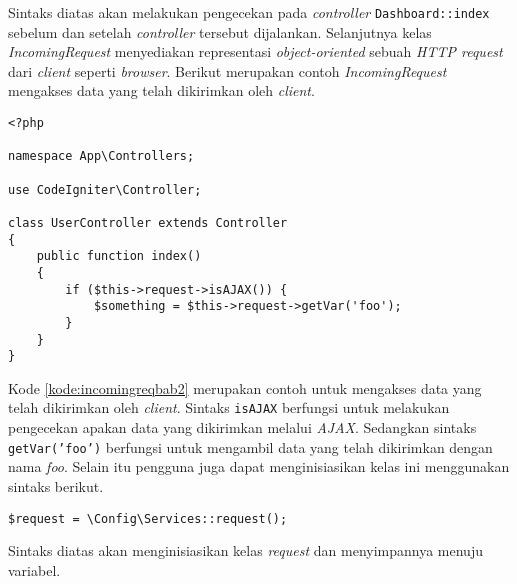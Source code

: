Sintaks diatas akan melakukan pengecekan pada \textit{controller} \texttt{Dashboard::index} sebelum dan setelah \textit{controller} tersebut dijalankan. Selanjutnya kelas \textit{IncomingRequest} menyediakan representasi \textit{object-oriented} sebuah \textit{HTTP request} dari \textit{client} seperti \textit{browser}. Berikut merupakan contoh \textit{IncomingRequest} mengakses data yang telah dikirimkan oleh \textit{client}.
\begin{lstlisting}[caption=Contoh mengakses data menggunakan \textit{IncomingRequest},label=kode:incomingreqbab2]
<?php

namespace App\Controllers;

use CodeIgniter\Controller;

class UserController extends Controller
{
    public function index()
    {
        if ($this->request->isAJAX()) {
            $something = $this->request->getVar('foo');
        }
    }
}
\end{lstlisting}
Kode \ref{kode:incomingreqbab2} merupakan contoh untuk mengakses data yang telah dikirimkan oleh \textit{client}. Sintaks \texttt{isAJAX} berfungsi untuk melakukan pengecekan apakan data yang dikirimkan melalui \textit{AJAX}. Sedangkan sintaks \texttt{getVar('foo')} berfungsi untuk mengambil data yang telah dikirimkan dengan nama \textit{foo}. Selain itu pengguna juga dapat menginisiasikan kelas ini menggunakan sintaks berikut.
\begin{center}
	\verb|$request = \Config\Services::request();|
\end{center}
Sintaks diatas akan menginisiasikan kelas \textit{request} dan menyimpannya menuju variabel.

